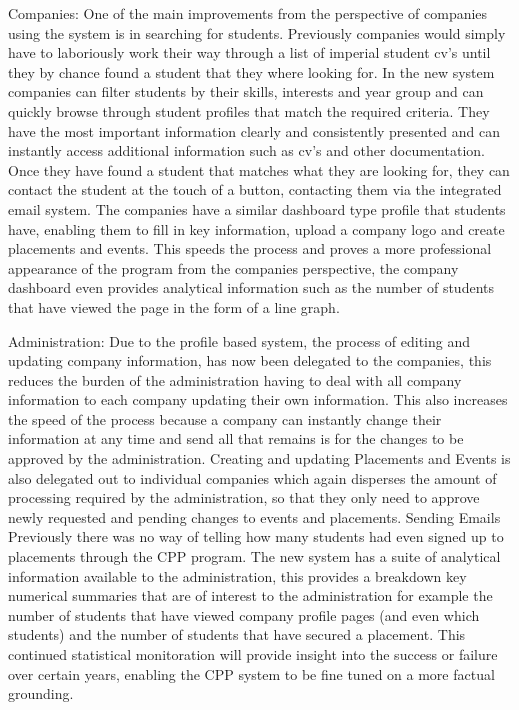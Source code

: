 Companies:
One of the main improvements from the perspective of companies using the system is in searching for students. Previously companies would simply have to laboriously work their way through a list of imperial student cv’s until they by chance found a student that they where looking for. In the new system companies can filter students by their skills, interests and year group and can quickly browse through student profiles that match the required criteria. They have the most important information clearly and consistently presented and can instantly access additional information such as cv’s and other documentation. Once they have found a student that matches what they are looking for, they can contact the student at the touch of a button, contacting them via the integrated email system.
The companies have a similar dashboard type profile that students have, enabling them to fill in key information, upload a company logo and create placements and events. This speeds the process and proves a more professional appearance of the program from the companies perspective, the company dashboard even provides analytical information such as the number of students that have viewed the page in the form of a line graph. 

Administration:
Due to the profile based system, the process of editing and updating company information, has now been delegated to the companies, this reduces the burden of the administration having to deal with all company information to each company updating their own information. This also increases the speed of the process because a company can instantly change their information at any time and send all that remains is for the changes to be approved by the administration.
Creating and updating Placements and Events is also delegated out to individual companies which again disperses the amount of processing required by the administration, so that they only need to approve newly requested and pending changes to events and placements.
Sending Emails 
Previously there was no way of telling how many students had even signed up to placements through the CPP program. The new system has a suite of analytical information available to the administration, this provides a breakdown key numerical summaries that are of interest to the administration for example the number of students that have viewed company profile pages (and even which students) and the number of students that have secured a placement. This continued statistical monitoration will provide insight into the success or failure over certain years, enabling the CPP system to be fine tuned on a more factual grounding. 

